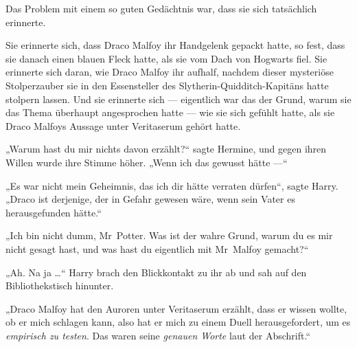 Das Problem mit einem so guten Gedächtnis war, dass sie sich tatsächlich erinnerte.



Sie erinnerte sich, dass Draco Malfoy ihr Handgelenk gepackt hatte, so fest, dass sie danach einen blauen Fleck hatte, als sie vom Dach von Hogwarts fiel. Sie erinnerte sich daran, wie Draco Malfoy ihr aufhalf, nachdem dieser mysteriöse Stolperzauber sie in den Essensteller des Slytherin-Quidditch-Kapitäns hatte stolpern lassen. Und sie erinnerte sich — eigentlich war das der Grund, warum sie das Thema überhaupt angesprochen hatte — wie sie sich gefühlt hatte, als sie Draco Malfoys Aussage unter Veritaserum gehört hatte.

„Warum hast du mir nichts davon erzählt?“ sagte Hermine, und gegen ihren Willen wurde ihre Stimme höher.
„Wenn ich das gewusst hätte —“

„Es war nicht mein Geheimnis, das ich dir hätte verraten dürfen“, sagte Harry.
„Draco ist derjenige, der in Gefahr gewesen wäre, wenn sein Vater es herausgefunden hätte.“

„Ich bin nicht dumm, Mr~Potter. Was ist der wahre Grund, warum du es mir nicht gesagt hast, und was hast du eigentlich mit Mr~Malfoy gemacht?“

„Ah. Na ja …“ Harry brach den Blickkontakt zu ihr ab und sah auf den Bibliothekstisch hinunter.

„Draco Malfoy hat den Auroren unter Veritaserum erzählt, dass er wissen wollte, ob er mich schlagen kann, also hat er mich zu einem Duell herausgefordert, um es \emph{empirisch zu testen}. Das waren seine \emph{genauen Worte} laut der Abschrift.“

